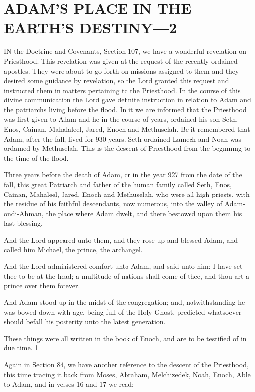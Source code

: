 \chapter{ADAM'S PLACE IN THE EARTH'S DESTINY—2}

IN the Doctrine and Covenants, Section 107, we have a wonderful revelation on Priesthood.
This revelation was given at the request of the recently ordained apostles. They were about to
go forth on missions assigned to them and they desired some guidance by revelation, so the
Lord granted this request and instructed them in matters pertaining to the Priesthood. In the
course of this divine communication the Lord gave definite instruction in relation to Adam
and the patriarchs living before the flood. In it we are informed that the Priesthood was first
given to Adam and he in the course of years, ordained his son Seth, Enos, Cainan,
Mahalaleel, Jared, Enoch and Methuselah. Be it remembered that Adam, after the fall, lived
for 930 years. Seth ordained Lamech and Noah was ordained by Methuselah. This is the
descent of Priesthood from the beginning to the time of the flood.

Three years before the death of Adam, or in the year 927 from the date of the fall, this great
Patriarch and father of the human family called Seth, Enos, Cainan, Mahaleel, Jared, Enoch
and Methuselah, who were all high priests, with the residue of his faithful descendants, now
numerous, into the valley of Adam-ondi-Ahman, the place where Adam dwelt, and there
bestowed upon them his last blessing.

And the Lord appeared unto them, and they rose up and blessed Adam, and called him
Michael, the prince, the archangel.

And the Lord administered comfort unto Adam, and said unto him: I have set thee to be at
the head; a multitude of nations shall come of thee, and thou art a prince over them forever.

And Adam stood up in the midst of the congregation; and, notwithstanding he was bowed
down with age, being full of the Holy Ghost, predicted whatsoever should befall his posterity
unto the latest generation.

These things were all written in the book of Enoch, and are to be testified of in due time. 1

Again in Section 84, we have another reference to the descent of the Priesthood, this time
tracing it back from Moses, Abraham, Melchizedek, Noah, Enoch, Able to Adam, and in
verses 16 and 17 we read:

